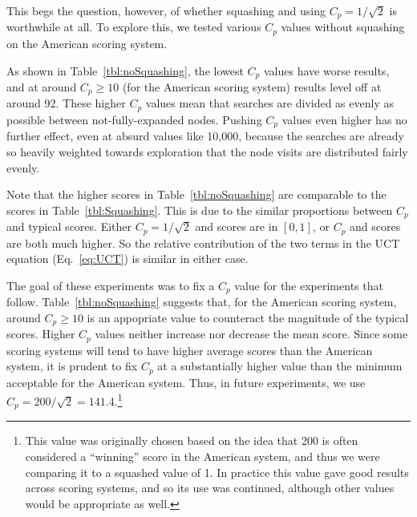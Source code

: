 \documentclass[letterpaper]{article}
\begin{document}
This begs the question, however, of whether squashing and using $C_p = 1 / \sqrt{2}$ is worthwhile at all. To explore this, we tested various $C_p$ values without squashing on the American scoring system.

As shown in  Table~\ref{tbl:noSquashing}, the lowest $C_p$ values have worse results, and at around $C_p \geq 10$ (for the American scoring system) results level off at around 92. These higher $C_p$ values mean that searches are divided as evenly as possible between not-fully-expanded nodes. Pushing $C_p$ values even higher has no further effect, even at absurd values like 10,000, because the searches are already so heavily weighted towards exploration that the node visits are distributed fairly evenly.

Note that the higher scores in Table~\ref{tbl:noSquashing} are comparable to the scores in Table~\ref{tbl:Squashing}. This is due to the similar proportions between $C_p$ and typical scores. Either $C_p  = 1 / \sqrt{2}$ and scores are in $[0,1]$, or $C_p$ and scores are both much higher. So the relative contribution of the two terms in the UCT equation (Eq.~\ref{eq:UCT}) is similar in either case.

The goal of these experiments was to fix a $C_p$ value for the experiments that follow. Table~\ref{tbl:noSquashing} suggests that, for the American scoring system, around $C_p \geq 10$ is an appopriate value to counteract the magnitude of the typical scores. Higher $C_p$ values neither increase nor decrease the mean score. Since some scoring systems will tend to have higher average scores than the American system, it is prudent to fix $C_p$ at a substantially higher value than the minimum acceptable for the American system. Thus, in future experiments, we use $C_p = 200 / \sqrt{2} = 141.4$.\footnote{This value was originally chosen based on the idea that 200 is often considered a ``winning'' score in the American system, and thus we were comparing it to a squashed value of 1. In practice this value gave good results across scoring systems, and so its use was continued, although other values would be appropriate as well.}

\end{document}
